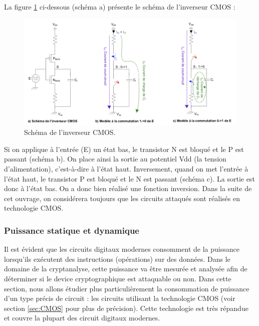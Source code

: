 \documentclass[10pt, oneside, a4paper]{article}
\begin{document}
\hspace{-0.5 cm}La figure \ref{fig:CMOS} ci-dessous (schéma a) présente le schéma de l'inverseur CMOS :
\begin{figure}[htbp]
    \centering
    \includegraphics[scale=0.8]{image/CMOS}
    \caption{Schéma de l'inverseur CMOS.}
    \label{fig:CMOS} 
\end{figure}

Si on applique à l'entrée (E) un état bas, le transistor N est bloqué et le P est passant (schéma b). On place ainsi la sortie au potentiel Vdd (la tension d'alimentation), c'est-à-dire à l'état haut. Inversement, quand on met l'entrée à l'état haut, le transistor P est bloqué et le N est passant (schéma c). La sortie est donc à l'état bas. On a donc bien réalisé une fonction inversion. Dans la suite de cet ouvrage, on considérera toujours que les circuits attaqués sont réalisés en technologie CMOS.


\subsubsection{Puissance statique et dynamique}
\label{sec:puissance}
Il est évident que les circuits digitaux modernes consomment de la puissance lorsqu'ils exécutent des instructions (opérations) sur des données. Dans le domaine de la cryptanalyse, cette puissance va être mesurée et analysée afin de déterminer si le device cryptographique est attaquable ou non. Dans cette section, nous allons étudier plus particulièrement la consommation de puissance d'un type précis de circuit : les circuits utilisant la technologie CMOS (voir section \ref{sec:CMOS} pour plus de précision). Cette technologie est très répandue et couvre la plupart des circuit digitaux modernes. 
\end{document}
